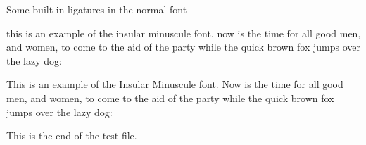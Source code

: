 \documentclass{article}
\newcommand{\sentence}{%
this is an example of the insular minuscule font. now is the time for all good
men, and women, to come to the aid of the party while the quick brown fox
jumps over the lazy dog:}
\newcommand{\Sentence}{%
This is an example of the Insular Minuscule font. Now is the time for all good
men, and women, to come to the aid of the party while the quick brown fox
jumps over the lazy dog:}
\newcommand{\esses}{sa sb sc sd se sf sg sh si sj sk sl sm 
                    sn so sp sq sr ss st su sv sw sx sy sz}
\newcommand{\exes}{xa xb xc xd xe xf xg xh xi xj xk xl xm 
                  xn xo xp xq xr xs xt xu xv xw xx xy xz}
\newcommand{\jays}{aj bj cj dj ej fj gj hj ij jj kj lj mj 
                   nj oj pj qj rj sj tj uj vj wj xj yj zj}
\newcommand{\dees}{ad bd cd dd ed fd gd hd id jd kd ld md 
                   nd od pd qd rd sd td ud vd wd xd yd zd}
\newcommand{\ares}{ra rb rc rd re rf rg rh ri rj rk rl rm 
                   rn ro rp rq rr rs rt ru rv rw rx ry rz}
\newcommand{\Esses}{SA SB SC SD SE SF SG SH SI SJ SK SL SM 
                    SN SO SP SQ SR SS ST SU SV SW SX SY SZ}
\newcommand{\Exes}{XA XB XC XD XE XF XG XH XI XJ XK XL XM 
                  XN XO XP XQ XR XS XT XU XV XW XX XY XZ}
\newcommand{\Jays}{AJ BJ CJ DJ EJ FJ GJ HJ IJ JJ KJ LJ MJ 
                   NJ OJ PJ QJ RJ SJ TJ UJ VJ WJ XJ YJ ZJ}
\newcommand{\Dees}{AD BD CD DD ED FD GD HD ID JD KD LD MD 
                   ND OD PD QD RD SD TD UD VD WD XD YD ZD}
\newcommand{\Ares}{RA RB RC RD RE RF RG RH RI RJ RK RL RM 
                   RN RO RP RQ RR RS RT RU RV RW RX RY RZ}
\begin{document}
\begin{center}
    Some built-in ligatures in the normal font \\
\end{center}


{
\iminfamily 
\sentence{}

\Sentence{}
}
    
    This is the end of the test file.
\end{document}
